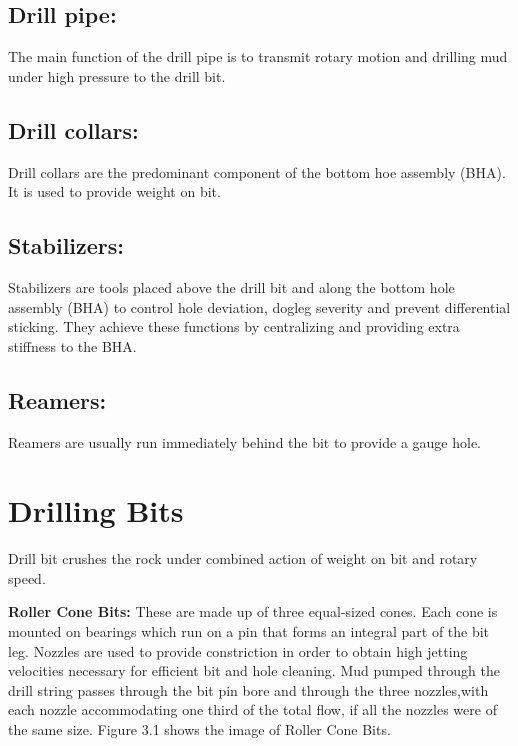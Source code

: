 \vspace{1em}

\subsection*{\textbf{Drill pipe:}} The main function of the drill pipe is to transmit rotary motion and
drilling mud under high pressure to the drill bit.

\vspace{1em}

\subsection*{\textbf{Drill collars:}} Drill collars are the predominant component of the bottom hoe assembly (BHA). 
It is used to provide weight on bit.

\vspace{1em}

\subsection*{\textbf{Stabilizers:}} Stabilizers are tools placed above the drill bit and along the bottom hole assembly (BHA)
to control hole deviation, dogleg severity and prevent differential sticking. 
They achieve these functions by centralizing and providing extra stiffness to the BHA.

\vspace{1em}


\subsection*{\textbf{Reamers:}} Reamers are usually run immediately behind the bit to provide a gauge hole.


\section{Drilling Bits}

Drill bit crushes the rock under combined action of weight on bit and rotary speed.

\vspace{1em}

\textbf{Roller Cone Bits:} These are made up of three equal-sized cones. Each cone is 
mounted on bearings which run on a pin that forms an integral part of the bit leg.
Nozzles are used to provide constriction in order to obtain high jetting velocities 
necessary for efficient bit and hole cleaning. Mud pumped through the drill string passes 
through the bit pin bore and through the three nozzles,with each nozzle accommodating 
one third of the total flow, if all the nozzles were of the same size.
Figure 3.1 shows the image of Roller Cone Bits.

